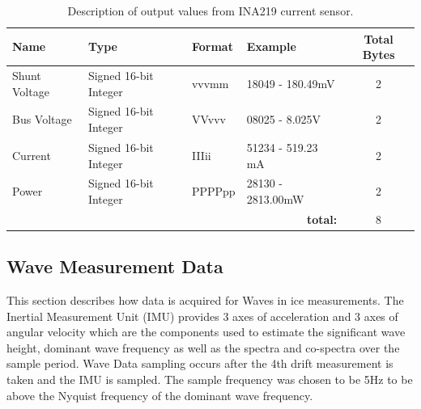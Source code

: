\begin{table}[H]
    \centering
    \caption{Description of output values from INA219 current sensor.}
    \begin{tabular}{|l|l|l|l|c|}
        \hline
        \textbf{Name }& \textbf{Type} &\textbf{Format} & \textbf{Example} & \textbf{Total Bytes} \\
        \hline
        Shunt Voltage & Signed 16-bit Integer & vvvmm & 18049 - 180.49mV & 2 \\
        \hline
        Bus Voltage & Signed 16-bit Integer & VVvvv & 08025 - 8.025V & 2 \\
        \hline
        Current & Signed 16-bit Integer & IIIii & 51234 - 519.23 mA & 2 \\
        \hline
        Power & Signed 16-bit Integer & PPPPpp &  28130 - 2813.00mW & 2 \\
        \hline
        \multicolumn{4}{r}{\textbf{total:}} & \multicolumn{1}{c}{8}\\
        \cline{5-5}
        \cline{5-5}
    \end{tabular}

    \label{tab:INA_Output}
\end{table}

\subsection{Wave Measurement Data}

This section describes how data is acquired for Waves in ice measurements. The Inertial Measurement Unit (IMU) provides 3 axes of acceleration and 3 axes of angular velocity which are the components used to estimate the significant wave height, dominant wave frequency as well as the spectra and co-spectra over the sample period. Wave Data sampling occurs after the 4th drift measurement is taken and the IMU is sampled. The sample frequency was chosen to be 5Hz to be above the Nyquist frequency of the dominant wave frequency.\par 

